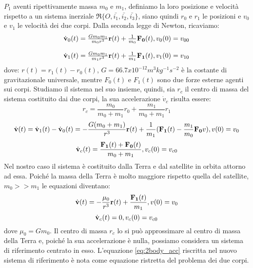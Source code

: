 $P_1$ aventi ripettivamente massa $m_0$ e $m_1$, definiamo la loro posizione e
velocità rispetto a un sistema inerziale $\mathfrak{R} \{
O,\bar{i_1},\bar{i_2},\bar{i_3}\}$, siano quindi $r_0$ e $r_1$ le posizioni e
$v_0$ e $v_1$ le velocità dei due corpi. Dalla seconda legge di Newton,
ricaviamo:
\begin{equation}
\begin{array}{l}
\dot{\bf v}_0(t)=\frac{Gm_0m_1}{m_0r^3}{\bf r}(t) +
\frac{1}{m_0}{\bf F_0}(t),v_0(0)=v_{00}\\\\
\dot{\bf v}_1(t)=\frac{Gm_0m_1}{m_1r^3}{\bf r}(t) +
\frac{1}{m_1}{\bf F_1}(t),v_1(0)=v_{10}
\end{array}
\end{equation}
dove: $r(t)=r_1(t)-r_0(t)$, $G=66.7x10^{-12} m^3kg^{-1}s^{-2}$ è la costante di
gravitazionale universale, mentre $F_0(t)$ e $F_1(t)$ sono due forze esterne
agenti sui corpi.
Studiamo il sistema nel suo insieme, quindi, sia $r_c$ il centro di massa del
sistema costituito dai due corpi, la sua accelerazione $\dot{v}_c$ risulta
essere:
\[r_c=\frac{m_0}{m_0+m_1}r_0+\frac{m_1}{m_0+m_1}r_1\]
\begin{equation}
\dot{\bf v}(t)=\dot{\bf v}_1(t)-\dot{\bf v}_0(t)=-\frac{G(m_0+m_1)}{r^3}{\bf
r}(t)+\frac{1}{m_1}({\bf F_1}(t)-\frac{m_1}{m_0}{\bf F_0}v), v(0)=v_0
\end{equation}
\begin{equation}
\dot{\bf v}_c(t)=\frac{{\bf F_1}(t)+{\bf F_0}(t)}{m_0+m_1},v_c(0)=v_{c0}
\end{equation}
Nel nostro caso il sistema è costituito dalla Terra e dal satellite in orbita
attorno ad essa. Poiché la massa della Terra è molto maggiore rispetto quella
del satellite, $m_0>>m_1$ le equazioni diventano:
\begin{equation}
\dot{\bf v}(t)=-\frac{\mu_0}{r^3}{\bf r}(t)+\frac{{\bf F_1}(t)}{m_1}, v(0)=v_0
\label{eq:2body_acc}
\end{equation}
\begin{equation}
\dot{\bf v}_c(t)=0, v_c(0)=v_{c0}
\end{equation}
dove $\mu_0=Gm_0$.
Il centro di massa $r_c$ lo si può approssimare al centro di massa della Terra
e, poiché la sua accelerazione è nulla, possiamo considera un sistema di
riferimento centrato in esso. L'equazione \ref{eq:2body_acc} riscritta
nel nuovo sistema di riferimento è nota come equazione ristretta del problema
dei due corpi.
